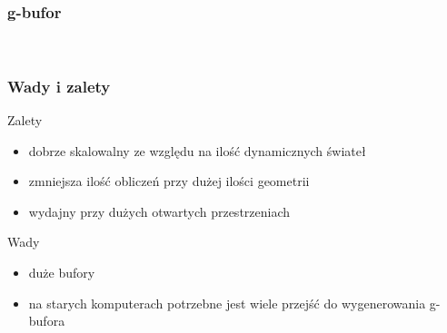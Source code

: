 \documentclass{beamer}
\begin{document}
\frame
{
	\frametitle{g-bufor}

	\begin{figure}
	\centering
	 \hspace{.2\textwidth}
	  \\
	 \hspace{.2\textwidth}
	\label{fig:deffered_rednering}
	\end{figure}
	\setcounter{subfigure}{0}
}

\frame
{
	\frametitle{Wady i zalety}

	\begin{block}{Zalety}
	\begin{itemize}
		\item dobrze skalowalny ze względu na ilość dynamicznych świateł
		\item zmniejsza ilość obliczeń przy dużej ilości geometrii
		\item wydajny przy dużych otwartych przestrzeniach
	\end{itemize}
	\end{block}
	\begin{block}{Wady}
	\begin{itemize}
		\item duże bufory
		\item na starych komputerach potrzebne jest wiele przejść do wygenerowania g-bufora
	\end{itemize}
	\end{block}
}
\end{document}
